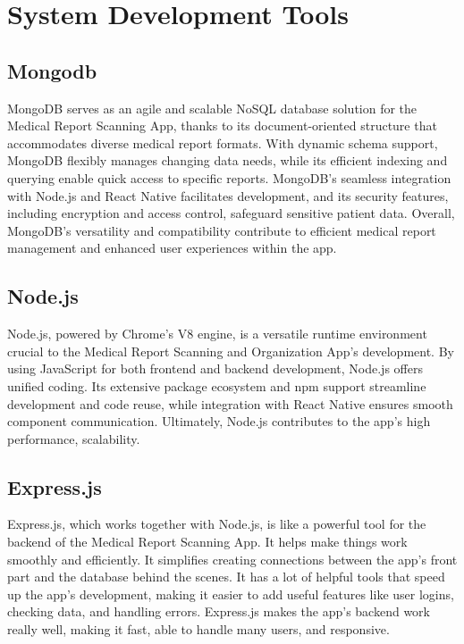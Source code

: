 \section{System Development Tools}
\subsection*{}
\subsection*{Mongodb}
MongoDB serves as an agile and scalable NoSQL database solution for the Medical Report Scanning  App, thanks to its document-oriented structure that accommodates diverse medical report formats. With dynamic schema support, MongoDB flexibly manages changing data needs, while its efficient indexing and querying enable quick access to specific reports. MongoDB's seamless integration with Node.js and React Native facilitates development, and its security features, including encryption and access control, safeguard sensitive patient data. Overall, MongoDB's versatility and compatibility contribute to efficient medical report management and enhanced user experiences within the app.
\subsection*{Node.js}
Node.js, powered by Chrome's V8 engine, is a versatile runtime environment crucial to the Medical Report Scanning and Organization App's development. By using JavaScript for both frontend and backend development, Node.js offers unified coding. Its extensive package ecosystem and npm support streamline development and code reuse, while integration with React Native ensures smooth component communication. Ultimately, Node.js contributes to the app's high performance, scalability.
\subsection*{Express.js}
Express.js, which works together with Node.js, is like a powerful tool for the backend of the Medical Report Scanning App. It helps make things work smoothly and efficiently. It simplifies creating connections between the app's front part and the database behind the scenes.  It has a lot of helpful tools that speed up the app's development, making it easier to add useful features like user logins, checking data, and handling errors. Express.js makes the app's backend work really well, making it fast, able to handle many users, and responsive.
